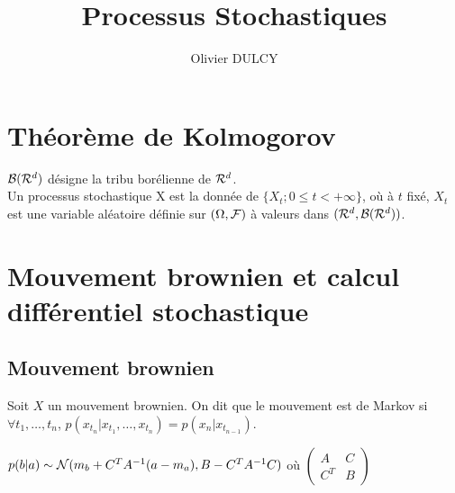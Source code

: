 

\title{Processus Stochastiques}
\author{Olivier DULCY}
\date{}



\pagestyle{theme}

\newcommand{\HRule}{\rule{\linewidth}{0.5mm}}
\newcommand\tikzmark[2][]{
  \tikz[remember picture,inner sep=\tabcolsep,outer sep=0,baseline=(#1.base),align=left]{\node[minimum width=\hsize](#1){$#2$};}
}


\maketitle

\frontmatter

\mainmatter

\chapter{Théorème de Kolmogorov}

$\mathcal{B}(\mathcal{R}^d)$ désigne la tribu borélienne de $\mathcal{R}^d$. \\

\Def Un processus stochastique X est la donnée de $\{X_t; 0\leq t < +\infty\}$, où à $t$ fixé, $X_t$ est une variable aléatoire définie sur $(\Omega,\mathcal{F})$ à valeurs dans $(\mathcal{R}^d,\mathcal{B}(\mathcal{R}^d))$.
\chapter{Mouvement brownien et calcul différentiel stochastique}
\section{Mouvement brownien}

\Def Soit $X$ un mouvement brownien. On dit que le mouvement est de Markov si $\forall t_1,\ldots,t_n$, $p(x_{t_n}\vert x_{t_1}, \ldots, x_{t_n}) = p(x_n \vert x_{t_{n-1}})$.

\Prop $p(b\vert a) \sim \mathcal{N}(m_b + C^T A^{-1}(a-m_a), B - C^T A^{-1} C)$ où 
$
\begin{pmatrix}
A & C \\
C^T & B
\end{pmatrix}
$


